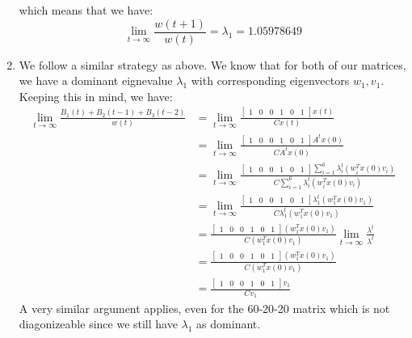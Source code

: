 \documentclass[12pt]{exam}
\begin{document}
\begin{questions}
\begin{solution}
\begin{enumerate}[label=(\alph*)]
      which means that we have:
      \[
        \lim_{t \to \infty} \frac{w(t+1)}{w(t)} = \lambda_1 = 1.05978649 
      \]
      \item
        We follow a similar strategy as above. We know that for both of our matrices, we have a dominant eignevalue $\lambda_1$ with corresponding eigenvectors $w_1, v_1$. Keeping this in mind, we have:
        \begin{align*}
          \lim_{t\to\infty} \frac{B_1(t) + B_2(t-1) + B_3(t-2)}{w(t)} &= \lim_{t\to \infty} \frac{\begin{bmatrix} 1 & 0 & 0 & 1 & 0 & 1 \end{bmatrix}x(t)}{Cx(t)} \tag{Expressing all values as functions of $x(t)$} \\
          &= \lim_{t\to \infty} \frac{\begin{bmatrix} 1 & 0 & 0 & 1 & 0 & 1 \end{bmatrix}A^tx(0)}{CA^tx(0)} \tag{Using the fact that $x(t) = A^tx(0)$}\\
          &= \lim_{t\to \infty} \frac{\begin{bmatrix} 1 & 0 & 0 & 1 & 0 & 1 \end{bmatrix}\sum_{i=1}^6 \lambda_i^{t}(w_i^Tx(0)v_i)}{C\sum_{i=1}^6 \lambda_i^{t}(w_i^Tx(0)v_i)} \tag{Expand into combination of modes}\\
          &= \lim_{t\to \infty} \frac{\begin{bmatrix} 1 & 0 & 0 & 1 & 0 & 1 \end{bmatrix} \lambda_1^{t}(w_1^Tx(0)v_1)}{C\lambda_1^{t}(w_1^Tx(0)v_1)} \tag{Only dominant eigenvalue remains as $t \to \infty$} \\
          &= \frac{\begin{bmatrix} 1 & 0 & 0 & 1 & 0 & 1 \end{bmatrix}(w_1^Tx(0)v_1)}{C(w_1^Tx(0)v_1)} \lim_{t\to \infty} \frac{\lambda^t}{\lambda^t} \tag{Factor out constats} \\
          &= \frac{\begin{bmatrix} 1 & 0 & 0 & 1 & 0 & 1 \end{bmatrix}(w_1^Tx(0)v_1)}{C(w_1^Tx(0)v_1)}\tag{Limit is $1$} \\
          &= \frac{\begin{bmatrix} 1 & 0 & 0 & 1 & 0 & 1 \end{bmatrix}v_1}{Cv_1} \tag{Get rid of scalar $w_1^Tx(0)$}
        \end{align*}
        A very similar argument applies, even for the 60-20-20 matrix which is not diagonizeable since we still have $\lambda_1$ as dominant.



\end{enumerate}
\end{solution}
\end{questions}
\end{document}
